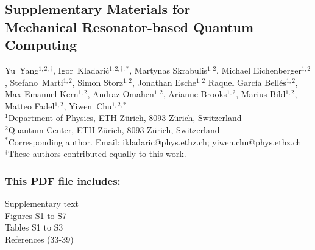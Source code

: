 \documentclass[12pt]{article}
\def\scititle{
Mechanical Resonator-based Quantum Computing
}
\begin{document}
\begin{center}
\section*{Supplementary Materials for\\ \scititle}




Yu~Yang$^{1,2,\dagger}$,
	Igor~Kladarić$^{1,2,\dagger,*}$,
	Martynas Skrabulis$^{1,2}$,
    Michael Eichenberger$^{1,2}$,
    Stefano~Marti$^{1,2}$,
    Simon Storz$^{1,2}$,
    Jonathan Esche$^{1,2}$
    Raquel García Bellés$^{1,2}$,
    Max Emanuel Kern$^{1,2}$,
    Andraz Omahen$^{1,2}$,
    Arianne Brooks$^{1,2}$,
    Marius Bild$^{1,2}$,
    Matteo Fadel$^{1,2}$,
    Yiwen~Chu$^{1,2,*}$\\
\small$^{1}$Department of Physics, ETH Zürich, 8093 Zürich, Switzerland \\
\small$^{2}$Quantum Center, ETH Zürich, 8093 Zürich, Switzerland \\

\small$^\ast$Corresponding author. Email: ikladaric@phys.ethz.ch; yiwen.chu@phys.ethz.ch \\
\small$^\dagger$These authors contributed equally to this work.
\end{center}




\subsubsection*{This PDF file includes:}
Supplementary text\\
Figures S1 to S7\\
Tables S1 to S3\\
References (33-39)

\newpage

\tableofcontents

\clearpage
\newpage
\end{document}
